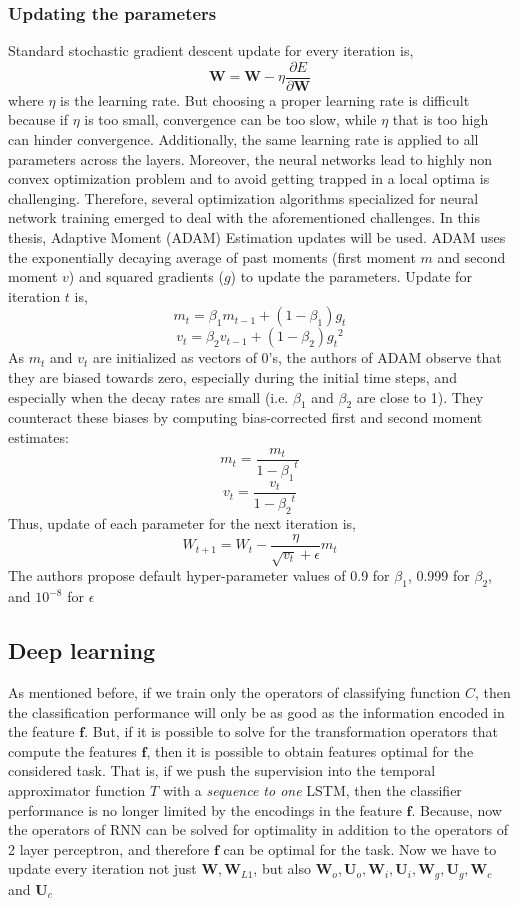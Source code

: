 \subsubsection{Updating the parameters}
Standard stochastic gradient descent update for every iteration is,
\[
\textbf{W} = \textbf{W} - \eta \frac{\partial E}{\partial \textbf{W}}
\]
where $\eta$ is the learning rate. But choosing a proper learning rate is difficult because if $\eta$ is too small, convergence can be too slow, while $\eta$ that is too high can hinder convergence. Additionally, the same learning rate is applied to all parameters across the layers. Moreover, the neural networks lead to highly non convex optimization problem and to avoid getting trapped in a local optima is challenging. Therefore, several optimization algorithms specialized for neural network training emerged to deal with the aforementioned challenges. In this thesis, Adaptive Moment (ADAM) Estimation updates\cite{adam} will be used. ADAM uses the exponentially decaying average of past moments (first moment $m$ and second moment $v$) and squared gradients ($g$) to update the parameters. Update for iteration $t$ is,
\[
m_{t} = \beta_{1}m_{t-1} + (1- \beta_{1})g_{t}
\]
\[
v_{t} = \beta_{2}v_{t-1} + (1-\beta_{2}){g_{t}}^{2}
\]
As $m_{t}$ and $v_{t}$ are initialized as vectors of 0's, the authors of ADAM observe that they are biased towards zero, especially during the initial time steps, and especially when the decay rates are small (i.e. $\beta_{1}$ and $\beta_{2}$ are close to 1). They counteract these biases by computing bias-corrected first and second moment estimates\cite{adam_o}:
\[
{m}_{t} = \frac{m_{t}}{1-{\beta_{1}}^{t}}
\]
\[
{v}_{t} = \frac{v_{t}}{1-{\beta_{2}}^{t}}
\]
Thus, update of each parameter for the next iteration is,
\[
W_{t+1} = W_{t} - \frac{\eta}{\sqrt{v_{t}} + \epsilon}m_{t}
\]
The authors propose default hyper-parameter values of 0.9 for $\beta_{1}$, 0.999 for $\beta_{2}$, and ${10}^{-8}$ for $\epsilon$

\subsection{Deep learning}
As mentioned before, if we train only the operators of classifying function $C$, then the classification performance will only be as good as the information encoded in the feature $\textbf{f}$. But, if it is possible to solve for the transformation operators that compute the features $\textbf{f}$, then it is possible to obtain features optimal for the considered task. That is, if we push the supervision into the temporal approximator function $T$ with a \textit{sequence to one} LSTM, then the classifier performance is no longer limited by the encodings in the feature $\textbf{f}$. Because, now the operators of RNN can be solved for optimality in addition to the operators of 2 layer perceptron, and therefore $\textbf{f}$ can be optimal for the task. Now we have to update every iteration not just $\textbf{W}, \textbf{W}_{L1}$, but also $\textbf{W}_{o}, \textbf{U}_{o}, \textbf{W}_{i}, \textbf{U}_{i}, \textbf{W}_{g}, \textbf{U}_{g}, \textbf{W}_{c}$ and $ \textbf{U}_{c}$   

